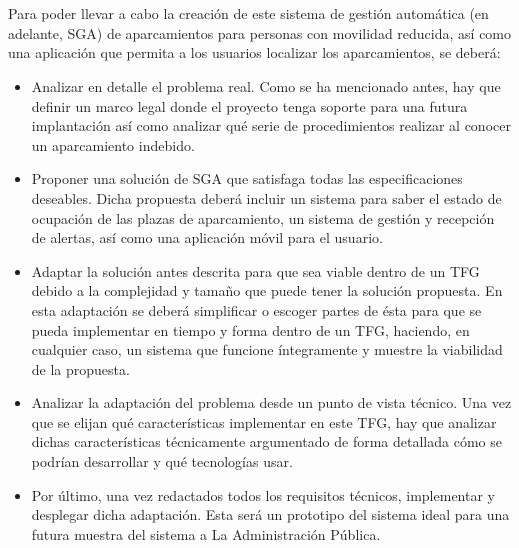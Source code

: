 \\\\
\newpage
Para poder llevar a cabo la creación de este sistema de gestión automática (en adelante, SGA) de aparcamientos para personas con movilidad reducida, así como una aplicación que permita a los usuarios localizar los aparcamientos, se deberá:
\begin{itemize}
	\item Analizar en detalle el problema real. Como se ha mencionado antes, hay que definir un marco legal donde el proyecto tenga soporte para una futura implantación así como analizar qué serie de procedimientos realizar al conocer un aparcamiento indebido.
	\item Proponer una solución de SGA  que satisfaga todas las especificaciones deseables. Dicha propuesta deberá incluir un sistema para saber el estado de ocupación de las plazas de aparcamiento, un sistema de gestión y recepción de alertas, así como una aplicación móvil para el usuario.
	\item Adaptar la solución antes descrita para que sea viable dentro de un TFG debido a la complejidad y tamaño que puede tener la solución propuesta. En esta adaptación se deberá simplificar o escoger partes de ésta para que se pueda implementar en tiempo y forma dentro de un TFG, haciendo, en cualquier caso, un sistema que funcione íntegramente y muestre la viabilidad de la propuesta.
	\item Analizar la adaptación del problema desde un punto de vista técnico. Una vez que se elijan qué características implementar en este TFG, hay que analizar dichas características técnicamente argumentado de forma detallada cómo se podrían desarrollar y qué tecnologías usar.
	\item Por último, una vez redactados todos los requisitos técnicos, implementar y desplegar dicha adaptación. Esta será un prototipo del sistema ideal para una futura muestra del sistema a La Administración Pública.
\end{itemize}
